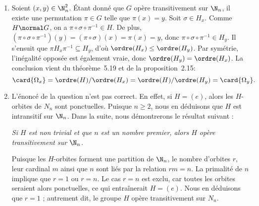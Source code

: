\begin{enumerate}
  \item
    Soient $(x,y)\in\N_n^2$.
    Étant donné que $G$ opère transitivement sur $\N_n$, il existe une permutation $\pi\in G$ telle que $\pi(x) = y$.
    Soit $\sigma\in H_x$.
    Comme $H\normal G$, on a $\pi\circ\sigma\circ\pi^{-1}\in H$.
    De plus, $(\pi\circ\sigma\circ\pi^{-1})(y) = (\pi\circ\sigma)(x) = \pi(x) = y$, donc $\pi\circ\sigma\circ\pi^{-1}\in H_y$.
    Il s'ensuit que $\pi H_x \pi^{-1} \subseteq H_y$, d'où $\ordre(H_x) \leq \ordre(H_y)$.
    Par symétrie, l'inégalité opposée est également vraie, donc $\ordre(H_y) = \ordre(H_x)$.
    La conclusion vient du théorème~5.19 et de la proposition~2.15:
    \[
      \card{\Omega_x}
        = \ordre(H)/\ordre(H_x)
        = \ordre(H)/\ordre(H_y)
        = \card{\Omega_y}.
    \]
  \item
    L'énoncé de la question n'est pas correct.
    En effet, si $H = (e)$, alors les $H$-orbites de $N_n$ sont ponctuelles.
    Puisque $n\geq 2$, nous en déduisons que $H$ est intransitif sur $\N_n$.
    Dans la suite, nous démontrerons le résultat suivant :

    \emph{Si $H$ est non trivial et que $n$ est un nombre premier, alors $H$ opère transitivement sur $\N_n$.}

    Puisque les $H$-orbites forment une partition de $\N_n$, le nombre d'orbites $r$, leur cardinal $m$ ainsi que $n$ sont liés par la relation $rm = n$.
    La primalité de $n$ implique que $r = 1$ ou $r = n$.
    Le cas $r = n$ est exclu, car toutes les orbites seraient alors ponctuelles, ce qui entraînerait $H = (e)$.
    Nous en déduisons que $r = 1$ ; autrement dit, le groupe $H$ opère transitivement sur $N_n$.
\end{enumerate}
